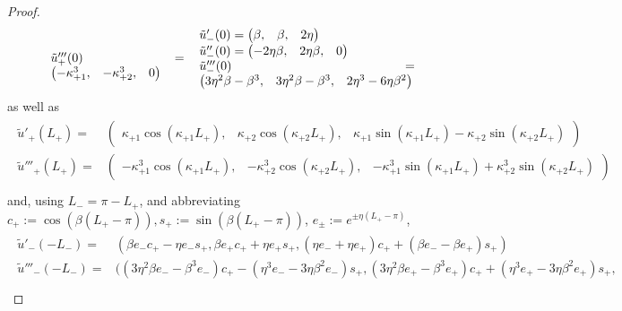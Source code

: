 \documentclass{article}
\numberwithin{equation}{section}
\begin{document}
\begin{proof}
\begin{equation}
\begin{tabular}{p{0.31\linewidth} p{0.5\linewidth}}
{					$\tilde{u}'''_+(0) = \begin{pmatrix}
						-\kappa_{+1}^3, & -\kappa_{+2}^3, & 0 
					\end{pmatrix}$
				}&
				\parbox{\linewidth}{$\tilde{u}'_-(0) = \begin{pmatrix}
						\beta, & \beta, & 2\eta
					\end{pmatrix}$ \\
					$\tilde{u}''_-(0) = \begin{pmatrix}
						-2 \eta \beta, & 2 \eta \beta, & 0
					\end{pmatrix}$ \\
					$\tilde{u}'''_-(0) = \begin{pmatrix}
						3 \eta^2 \beta - \beta^3, & 3 \eta^2 \beta - \beta^3, & 2 \eta^3 -6 \eta \beta^2
					\end{pmatrix}$
				}	
			\end{tabular}
		\end{equation}
		as well as  
		\begin{align}
			\begin{split}
				\tilde{u}'_+(L_+) =& \begin{pmatrix}
					\kappa_{+1} \cos(\kappa_{+1} L_+), & \kappa_{+2} \cos(\kappa_{+2} L_+), & \kappa_{+1} \sin(\kappa_{+1} L_+) - \kappa_{+2} \sin(\kappa_{+2} L_+)
				\end{pmatrix} \\
				\tilde{u}'''_+(L_+) =& \begin{pmatrix}
					-\kappa_{+1}^3 \cos(\kappa_{+1} L_+), & -\kappa_{+2}^3 \cos(\kappa_{+2} L_+), & -\kappa_{+1}^3 \sin(\kappa_{+1} L_+) + \kappa_{+2}^3 \sin(\kappa_{+2} L_+)
				\end{pmatrix} \\
			\end{split}
		\end{align}
		and, using $L_- = \pi - L_+$, and abbreviating $c_+:=\cos (\beta(L_+ - \pi)), s_+:=\sin (\beta(L_+ - \pi))$, $e_\pm:=e^{\pm\eta (L_+ - \pi)}$, 
		\begin{align}
			\begin{split}
				\tilde{u}'_-(-L_-) =&\left(\beta e_- c_+-\eta e_- s_+, 
				 \beta e_+ c_++\eta e_+ s_+, 
				 (\eta e_-  +\eta e_+) c_+ + (\beta e_-  -\beta e_+) s_+\right) \\
				\tilde{u}'''_-(-L_-) =& \big(
				(3\eta^2 \beta e_-  - \beta^3 e_-) c_+ - ( \eta^3 e_-  - 3\eta \beta^2 e_-) s_+, 
				(3\eta^2 \beta e_+  -\beta^3 e_+) c_+ + (\eta^3 e_+ - 3\eta \beta^2 e_+) s_+,\\

\end{split}
\end{align}
\end{proof}
\end{document}

